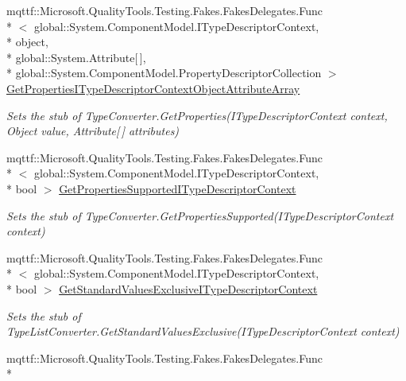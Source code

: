 \begin{DoxyCompactItemize}
mqttf\-::\-Microsoft.\-Quality\-Tools.\-Testing.\-Fakes.\-Fakes\-Delegates.\-Func\\*
$<$ global\-::\-System.\-Component\-Model.\-I\-Type\-Descriptor\-Context, \\*
object, \\*
global\-::\-System.\-Attribute\mbox{[}$\,$\mbox{]}, \\*
global\-::\-System.\-Component\-Model.\-Property\-Descriptor\-Collection $>$ \hyperlink{class_system_1_1_component_model_1_1_fakes_1_1_stub_type_list_converter_a464cee2f3a16f7cb01b396570ce721f1}{Get\-Properties\-I\-Type\-Descriptor\-Context\-Object\-Attribute\-Array}
\begin{DoxyCompactList}\small\item\em Sets the stub of Type\-Converter.\-Get\-Properties(\-I\-Type\-Descriptor\-Context context, Object value, Attribute\mbox{[}$\,$\mbox{]} attributes)\end{DoxyCompactList}\item 
mqttf\-::\-Microsoft.\-Quality\-Tools.\-Testing.\-Fakes.\-Fakes\-Delegates.\-Func\\*
$<$ global\-::\-System.\-Component\-Model.\-I\-Type\-Descriptor\-Context, \\*
bool $>$ \hyperlink{class_system_1_1_component_model_1_1_fakes_1_1_stub_type_list_converter_a0a5d2a4d19dbe63022799edcd6135d42}{Get\-Properties\-Supported\-I\-Type\-Descriptor\-Context}
\begin{DoxyCompactList}\small\item\em Sets the stub of Type\-Converter.\-Get\-Properties\-Supported(\-I\-Type\-Descriptor\-Context context)\end{DoxyCompactList}\item 
mqttf\-::\-Microsoft.\-Quality\-Tools.\-Testing.\-Fakes.\-Fakes\-Delegates.\-Func\\*
$<$ global\-::\-System.\-Component\-Model.\-I\-Type\-Descriptor\-Context, \\*
bool $>$ \hyperlink{class_system_1_1_component_model_1_1_fakes_1_1_stub_type_list_converter_ad2b9a7aeeca221068318faa7058983b1}{Get\-Standard\-Values\-Exclusive\-I\-Type\-Descriptor\-Context}
\begin{DoxyCompactList}\small\item\em Sets the stub of Type\-List\-Converter.\-Get\-Standard\-Values\-Exclusive(\-I\-Type\-Descriptor\-Context context)\end{DoxyCompactList}\item 
mqttf\-::\-Microsoft.\-Quality\-Tools.\-Testing.\-Fakes.\-Fakes\-Delegates.\-Func\\*

\end{DoxyCompactItemize}
